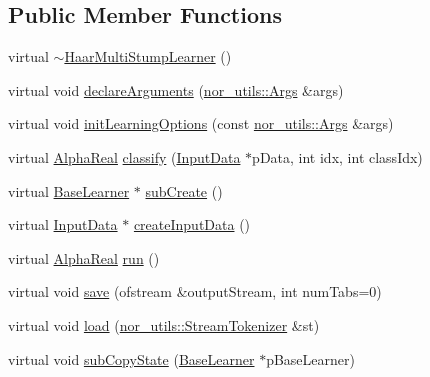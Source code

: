 \subsection*{Public Member Functions}
\begin{DoxyCompactItemize}
\item 
virtual \hyperlink{classMultiBoost_1_1HaarMultiStumpLearner_a6dc1d0be82bcaa0611a29788b19e800c}{$\sim$HaarMultiStumpLearner} ()
\item 
virtual void \hyperlink{classMultiBoost_1_1HaarMultiStumpLearner_af9cc0a38d034aa794af315ee5299691f}{declareArguments} (\hyperlink{classnor__utils_1_1Args}{nor\_\-utils::Args} \&args)
\item 
virtual void \hyperlink{classMultiBoost_1_1HaarMultiStumpLearner_a580bf43635d390488d1ccd41e1764daf}{initLearningOptions} (const \hyperlink{classnor__utils_1_1Args}{nor\_\-utils::Args} \&args)
\item 
virtual \hyperlink{Defaults_8h_a80184c4fd10ab70a1a17c5f97dcd1563}{AlphaReal} \hyperlink{classMultiBoost_1_1HaarMultiStumpLearner_a22d0c53fea68b6859c01767b238fddad}{classify} (\hyperlink{classMultiBoost_1_1InputData}{InputData} $\ast$pData, int idx, int classIdx)
\item 
virtual \hyperlink{classMultiBoost_1_1BaseLearner}{BaseLearner} $\ast$ \hyperlink{classMultiBoost_1_1HaarMultiStumpLearner_a97f7761d53ccb83f13ea09ceec6def50}{subCreate} ()
\item 
virtual \hyperlink{classMultiBoost_1_1InputData}{InputData} $\ast$ \hyperlink{classMultiBoost_1_1HaarMultiStumpLearner_aeeefa24435fa10752fbef68417ca3930}{createInputData} ()
\item 
virtual \hyperlink{Defaults_8h_a80184c4fd10ab70a1a17c5f97dcd1563}{AlphaReal} \hyperlink{classMultiBoost_1_1HaarMultiStumpLearner_abf51b50b842eab856467cff18479c90c}{run} ()
\item 
virtual void \hyperlink{classMultiBoost_1_1HaarMultiStumpLearner_ae4b26b79c47ed76ba87b0069ea2fd273}{save} (ofstream \&outputStream, int numTabs=0)
\item 
virtual void \hyperlink{classMultiBoost_1_1HaarMultiStumpLearner_aded39dbe1d2e0c5715a7dd2ee95fea91}{load} (\hyperlink{classnor__utils_1_1StreamTokenizer}{nor\_\-utils::StreamTokenizer} \&st)
\item 
virtual void \hyperlink{classMultiBoost_1_1HaarMultiStumpLearner_a23e1bf8c0ff7ccb455ca14d5ddae247f}{subCopyState} (\hyperlink{classMultiBoost_1_1BaseLearner}{BaseLearner} $\ast$pBaseLearner)
\end{DoxyCompactItemize}


